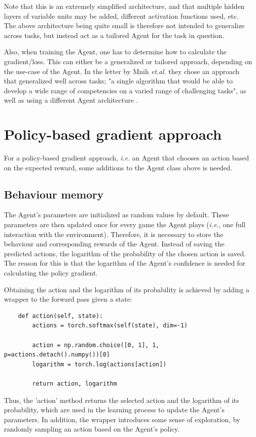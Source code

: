 \documentclass{article}
\renewenvironment{leftbar}[1][\hsize]{
    \def\FrameCommand{{\color{barcolor}\vrule width 2pt \hspace{10pt}}}
    \MakeFramed{\hsize#1 \advance\hsize-\width \FrameRestore}
}{\endMakeFramed}
\begin{document}
Note that this is an extremely simplified architecture, and that multiple hidden layers of variable units may be added, different activation functions used, etc. The above architecture being quite small is therefore not intended to generalize across tasks, but instead act as a tailored Agent for the task in question.

Also, when training the Agent, one has to determine how to calculate the gradient/loss. This can either be a generalized or tailored approach, depending on the use-case of the Agent. In the letter by Mnih \textit{et.al.} they chose an approach that generalized well across tasks; "a single algorithm that would be able to develop a wide range of competencies on a varied range of challenging tasks", as well as using a different Agent architecture \cite{Human-level}.

\section*{Policy-based gradient approach}

For a policy-based gradient approach, \textit{i.e.} an Agent that chooses an action based on the expected reward, some additions to the Agent class above is needed.

\subsection*{Behaviour memory}
\begin{leftbar}
    The Agent's parameters are initialized as random values by default. These parameters are then updated once for every game the Agent plays (\textit{i.e.}, one full interaction with the environment). Therefore, it is necessary to store the behaviour and corresponding rewards of the Agent. Instead of saving the predicted actions, the logarithm of the probability of the chosen action is saved. The reason for this is that the logarithm of the Agent's confidence is needed for calculating the policy gradient.
    
    Obtaining the action and the logarithm of its probability is achieved by adding a wrapper to the forward pass given a state:
    
    \begin{lstlisting}
    def action(self, state):
        actions = torch.softmax(self(state), dim=-1)
        
        action = np.random.choice([0, 1], 1, p=actions.detach().numpy())[0]
        logarithm = torch.log(actions[action])
        
        return action, logarithm
    \end{lstlisting}
    
    Thus, the 'action' method returns the selected action and the logarithm of its probability, which are used in the learning process to update the Agent's parameters. In addition, the wrapper introduces some sense of exploration, by randomly sampling an action based on the Agent's policy.
\end{leftbar}
\end{document}
